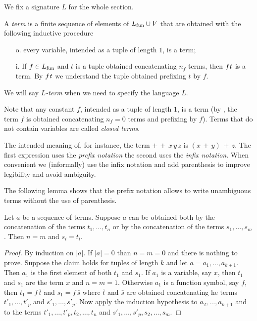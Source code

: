 We fix a signature $L$ for the whole section.

\begin{definition}\label{deftermine} 
A \emph{term\/} is a finite sequence of elements of $L_{\rm fun}\cup V$ that are obtained with the following inductive procedure
\begin{itemize}
\item[o.] every variable, intended as a tuple of length $1$, is a term;
\item[i.] If $f\in L_{\rm fun}$ and $t$ is a tuple obtained concatenating $n_f$ terms, then $f\kern0.1ex t$ is a term. By $f\kern0.1ex t$ we understand the tuple obtained prefixing $t$ by $f$.
\end{itemize}
We will say \emph{$L$-term\/} when we need to specify the language $L$.\QED
\end{definition}

Note that any constant $f$, intended as a tuple of length $1$, is a term (by , the term $f$ is obtained concatenating $n_f=0$ terms and prefixing by $f$). Terms that do not contain variables are called \emph{closed terms}.

The intended meaning of, for instance, the term ${+}\,{+}\,x\,y\,z$ is $(x\,{+}\,y)\,{+}\,z$. The first expression uses the \emph{prefix notation\/} the second uses the \emph{infix notation}. When convenient we (informally) use the infix notation and add parenthesis to improve legibility and avoid ambiguity.

The following lemma shows that the prefix notation allows to write unambiguous terms without the use of parenthesis.

\begin{lemma}\label{lemmaterminileggibilita}
Let $a$ be a sequence of terms. Suppose $a$ can be obtained both by the concatenation of the terms $t_1,\dots,t_n$ or by the concatenation of the terms $s_1,\dots,s_m$. Then $n=m$ and $s_i=t_i$.
\end{lemma}
\begin{proof}
By induction on $|a|$. If $|a|=0$ than $n=m=0$ and there is nothing to prove. Suppose the claim holds for tuples of length $k$ and let $a=a_1,\dots,a_{k+1}$. Then $a_1$ is the first element of both  $t_1$ and $s_1$. If $a_1$ is a variable, say $x$, then $t_1$ and $s_1$ are the term $x$ and $n=m=1$. Otherwise $a_1$ is a function symbol, say $f$, then $t_1=f\,\bar t$ and $s_1=f\,\bar s$ where $\bar t$ and $\bar s$ are obtained concatenating he terms $t'_1, \dots, t'_p$ and $s'_1, \dots, s'_p$.  Now apply the induction hypothesis to $a_2,\dots,a_{k+1}$ and to the terms $t'_1, \dots,t'_p,t_2,\dots,t_n$ and $s'_1,\dots,s'_p,s_2,\dots,s_m$.
\end{proof}

